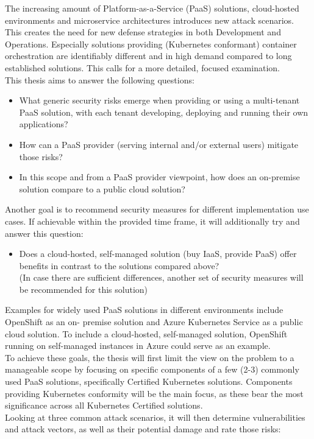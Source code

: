 The increasing amount of Platform-as-a-Service (PaaS) solutions, cloud-hosted environments and
microservice architectures introduces new attack scenarios. This creates the need for new defense
strategies in both Development and Operations. Especially solutions providing (Kubernetes
conformant) container orchestration are identifiably different and in high demand compared to long
established solutions. This calls for a more detailed, focused examination. \\
This thesis aims to answer the following questions:

\begin{itemize}

\item What generic security risks emerge when providing or using a multi-tenant PaaS solution,
with each tenant developing, deploying and running their own applications? 

\item How can a PaaS provider (serving internal and/or external users) mitigate those risks? 

\item  In this scope and from a PaaS provider viewpoint, how does an on-premise solution compare
to a public cloud solution? 

\end{itemize}

Another goal is to recommend security measures for different implementation use cases.
If achievable within the provided time frame, it will additionally try and answer this question: 

\begin{itemize}

\item Does a cloud-hosted, self-managed solution (buy IaaS, provide PaaS) offer benefits in
contrast to the solutions compared above? \\
(In case there are sufficient differences, another set of security measures will be
recommended for this solution)

\end{itemize}

Examples for widely used PaaS solutions in different environments include OpenShift as an on-
premise solution and Azure Kubernetes Service as a public cloud solution. To include a cloud-hosted,
self-managed solution, OpenShift running on self-managed instances in Azure could serve as an
example. \\
To achieve these goals, the thesis will first limit the view on the problem to a manageable scope by
focusing on specific components of a few (2-3) commonly used PaaS solutions, specifically Certified
Kubernetes solutions. Components providing Kubernetes conformity will be the main focus, as these
bear the most significance across all Kubernetes Certified solutions. \\
Looking at three common attack scenarios, it will then determine vulnerabilities and attack vectors,
as well as their potential damage and rate those risks:

